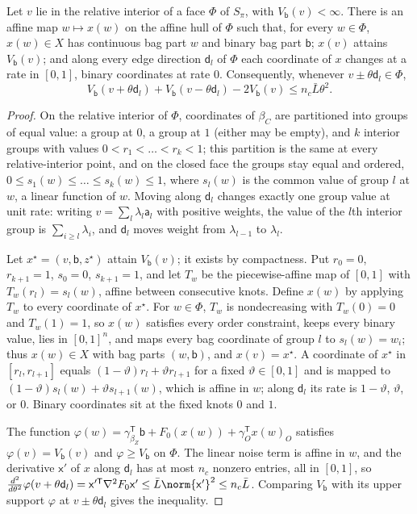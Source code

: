\begin{lemma}\label{lem:con:transport}
Let $v$ lie in the relative interior of a face $\Phi$ of $S_\pi$, with
$V_{\mathsf b}(v)<\infty$. There is an affine map $w\mapsto x(w)$ on the
affine hull of $\Phi$ such that, for every $w\in\Phi$, $x(w)\in X$ has
continuous bag part $w$ and binary bag part $\mathsf b$; $x(v)$ attains
$V_{\mathsf b}(v)$; and along every edge direction $\mathsf d_l$ of $\Phi$ each
coordinate of $x$ changes at a rate in $[0,1]$, binary coordinates at rate
$0$. Consequently, whenever $v\pm\theta\mathsf d_l\in\Phi$,
\[
 V_{\mathsf b}(v+\theta\mathsf d_l)+V_{\mathsf b}(v-\theta\mathsf d_l)
 -2V_{\mathsf b}(v)\le n_c\bar L\theta^2 .
\]
\end{lemma}

\begin{proof}
On the relative interior of $\Phi$, coordinates of $\beta_C$ are partitioned
into groups of equal value: a group at $0$, a group at $1$ (either may be
empty), and $k$ interior groups with values $0<r_1<\dots<r_k<1$; this
partition is the same at every relative-interior point, and on the closed
face the groups stay equal and ordered, $0\le s_1(w)\le\dots\le s_k(w)\le1$,
where $s_l(w)$ is the common value of group $l$ at $w$, a linear function of
$w$. Moving along $\mathsf d_l$ changes exactly one group value at unit rate:
writing $v=\sum_l\lambda_l\mathsf a_l$ with positive weights, the value of
the $l$th interior group is $\sum_{i\ge l}\lambda_i$, and $\mathsf d_l$ moves
weight from $\lambda_{l-1}$ to $\lambda_l$.

Let $x^\star=(v,\mathsf b,z^\star)$ attain $V_{\mathsf b}(v)$; it exists by
compactness. Put $r_0=0$, $r_{k+1}=1$, $s_0=0$, $s_{k+1}=1$, and let $T_w$ be
the piecewise-affine map of $[0,1]$ with $T_w(r_l)=s_l(w)$, affine between
consecutive knots. Define $x(w)$ by applying $T_w$ to every coordinate of
$x^\star$. For $w\in\Phi$, $T_w$ is nondecreasing with $T_w(0)=0$ and
$T_w(1)=1$, so $x(w)$ satisfies every order constraint, keeps every binary
value, lies in $[0,1]^n$, and maps every bag coordinate of group $l$ to
$s_l(w)=w_i$; thus $x(w)\in X$ with bag parts $(w,\mathsf b)$, and $x(v)=x^\star$.
A coordinate of $x^\star$ in $[r_l,r_{l+1}]$ equals
$(1-\vartheta)r_l+\vartheta r_{l+1}$ for a fixed $\vartheta\in[0,1]$ and is
mapped to $(1-\vartheta)s_l(w)+\vartheta s_{l+1}(w)$, which is affine in $w$;
along $\mathsf d_l$ its rate is $1-\vartheta$, $\vartheta$, or $0$. Binary
coordinates sit at the fixed knots $0$ and $1$.

The function $\varphi(w)=\gamma_{\beta_Z}^{\mathsf T}\mathsf b+F_0(x(w))+
\gamma_O^{\mathsf T}x(w)_O$ satisfies $\varphi(v)=V_{\mathsf b}(v)$ and
$\varphi\ge V_{\mathsf b}$ on $\Phi$. The linear noise term is affine in $w$,
and the derivative $\mathsf x'$ of $x$ along $\mathsf d_l$ has at most $n_c$
nonzero entries, all in $[0,1]$, so
$\frac{d^2}{d\theta^2}\varphi(v+\theta\mathsf d_l)=\mathsf x'^{\mathsf
T}\nabla^2F_0\mathsf x'\le\bar L\norm{\mathsf x'}^2\le n_c\bar L$. Comparing
$V_{\mathsf b}$ with its upper support $\varphi$ at $v\pm\theta\mathsf d_l$
gives the inequality.
\end{proof}

